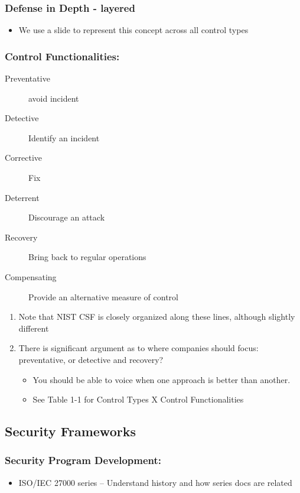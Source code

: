 \documentclass[11pt]{article}
\begin{document}
\subsubsection{Defense in Depth - layered}
\label{sec:orgc478878}
\begin{itemize}
\item We use a slide to represent this concept across all control types
\end{itemize}
\subsubsection{Control Functionalities:}
\label{sec:org51b8f20}
\begin{description}
\item[{Preventative}] avoid incident
\item[{Detective}] Identify an incident
\item[{Corrective}] Fix
\item[{Deterrent}] Discourage an attack
\item[{Recovery}] Bring back to regular operations
\item[{Compensating}] Provide an alternative measure of control
\end{description}
\begin{enumerate}
\item Note that NIST CSF is closely organized along these lines, although slightly different
\label{sec:org2292c58}
\item There is significant argument as to where companies should focus: preventative, or detective and recovery?
\label{sec:org4ab3d29}
\begin{itemize}
\item You should be able to voice when one approach is better than another.
\item See Table 1-1 for Control Types X Control Functionalities
\end{itemize}
\end{enumerate}
\subsection{Security Frameworks}
\label{sec:orgc074579}
\subsubsection{Security Program Development:}
\label{sec:orgce4ada1}
\begin{itemize}
\item ISO/IEC 27000 series 
-- Understand history and how series docs are related
\end{itemize}
\end{document}
